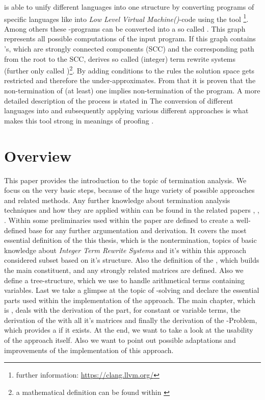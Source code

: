 \aprove is able to unify different languages into one structure by converting programs of specific languages like  into \textit{Low Level Virtual Machine(\llvm)}-code using the tool  \footnote{further information: \url{https://clang.llvm.org/}}. Among others these \llvm-programs can be converted into a so called \seg. This graph represents all possible computations of the input program. If this graph contains \lasso's, which are strongly connected components (SCC) and the corresponding path from the root to the SCC, \aprove derives so called (integer) term rewrite systems (further only called \its)\footnote{a mathematical definition can be found within \cite{fuhs2009proving}}. By adding conditions to the \its rules the solution space gets restricted and therefore the \its under-approximates. From that it is proven that the non-termination of (at least) one \its implies non-termination of the program. A more detailed description of the process is stated in \cite{hensel2017aprove} \newline
The conversion of different languages into \its and subsequently applying various different approaches is what makes this tool strong in meanings of proofing \cite{giesl2017analyzing}.

\section{Overview}
\label{sec:overview}
This paper provides the introduction to the topic of termination analysis. We focus on the very basic steps, because of the huge variety of possible approaches and related methods. Any further knowledge about termination analysis techniques and how they are applied within \aprove can be found in the related papers \cite{giesl2017analyzing}, \cite{giesl2006aprove}, \cite{giesl2003aprove}.\newline
Within  some preliminaries used within the paper are defined to create a well-defined base for any further argumentation and derivation. It covers the most essential definition of the this thesis, which is the nontermination, topics of basic knowledge about \textit{Integer Term Rewrite Systems} and it's within this approach considered subset based on it's structure. Also the definition of the \gna, which builds the main constituent, and any strongly related matrices are defined. Also we define a tree-structure, which we use to handle arithmetical terms containing variables. Last we take a glimpse at the topic of -solving and declare the essential parts used within the implementation of the approach.\newline
The main chapter, which is , deals with the derivation of the \stem part, for constant or variable terms, the derivation of the \loopt with all it's matrices and finally the derivation of the -Problem, which provides a \gna if it exists. \newline
At the end, we want to take a look at the usability of the approach itself. Also we want to point out possible adaptations and improvements of the implementation of this approach.